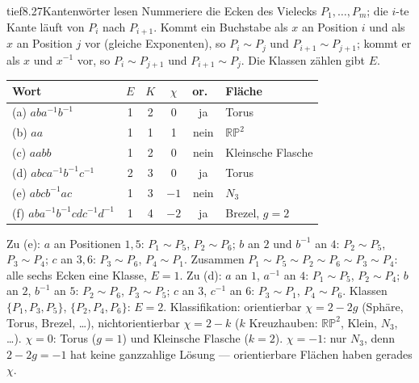 \begin{loesungkarte}{tief}{8.27}{Kantenwörter lesen}
Nummeriere die Ecken des Vielecks $P_1, \dots, P_m$; die $i$-te Kante läuft von $P_i$ nach $P_{i+1}$. Kommt ein Buchstabe als $x$ an Position $i$ und als $x$ an Position $j$ vor (gleiche Exponenten), so $P_i\sim P_j$ und $P_{i+1}\sim P_{j+1}$; kommt er als $x$ und $x^{-1}$ vor, so $P_i\sim P_{j+1}$ und $P_{i+1}\sim P_j$. Die Klassen zählen gibt $E$.
\begin{center}\small
\begin{tabular}{l|cccc|l}
Wort & $E$ & $K$ & $\chi$ & or.\ & Fläche\\ \hline
(a) $aba^{-1}b^{-1}$ & 1 & 2 & 0 & ja & Torus\\
(b) $aa$ & 1 & 1 & 1 & nein & $\mathbb{RP}^{2}$\\
(c) $aabb$ & 1 & 2 & 0 & nein & Kleinsche Flasche\\
(d) $abca^{-1}b^{-1}c^{-1}$ & 2 & 3 & 0 & ja & Torus\\
(e) $abcb^{-1}ac$ & 1 & 3 & $-1$ & nein & $N_3$\\
(f) $aba^{-1}b^{-1}cdc^{-1}d^{-1}$ & 1 & 4 & $-2$ & ja & Brezel, $g = 2$
\end{tabular}
\end{center}
Zu (e): $a$ an Positionen $1, 5$: $P_1\sim P_5$, $P_2\sim P_6$; $b$ an $2$ und $b^{-1}$ an $4$: $P_2\sim P_5$, $P_3\sim P_4$; $c$ an $3, 6$: $P_3\sim P_6$, $P_4\sim P_1$. Zusammen $P_1\sim P_5\sim P_2\sim P_6\sim P_3\sim P_4$: alle sechs Ecken eine Klasse, $E = 1$. Zu (d): $a$ an $1$, $a^{-1}$ an $4$: $P_1\sim P_5$, $P_2\sim P_4$; $b$ an $2$, $b^{-1}$ an $5$: $P_2\sim P_6$, $P_3\sim P_5$; $c$ an $3$, $c^{-1}$ an $6$: $P_3\sim P_1$, $P_4\sim P_6$. Klassen $\{P_1, P_3, P_5\}$, $\{P_2, P_4, P_6\}$: $E = 2$.
Klassifikation: orientierbar $\chi = 2 - 2g$ (Sphäre, Torus, Brezel, \dots), nichtorientierbar $\chi = 2 - k$ ($k$ Kreuzhauben: $\mathbb{RP}^{2}$, Klein, $N_3$, \dots). $\chi = 0$: Torus ($g = 1$) und Kleinsche Flasche ($k = 2$). $\chi = -1$: nur $N_3$, denn $2 - 2g = -1$ hat keine ganzzahlige Lösung --- orientierbare Flächen haben gerades $\chi$.

\end{loesungkarte}
